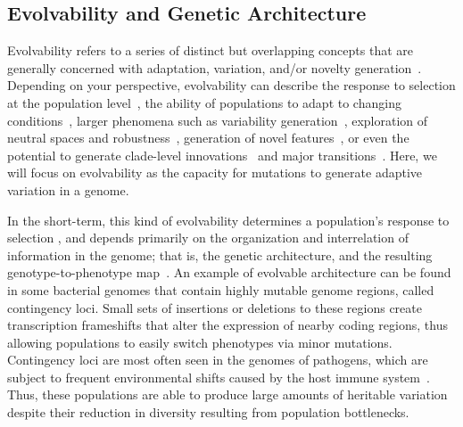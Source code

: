 \documentclass[10pt,letterpaper]{article}
\begin{document}
\subsection*{Evolvability and Genetic Architecture}
Evolvability refers to a series of distinct but overlapping concepts that are generally concerned with adaptation, variation, and/or novelty generation~\cite{pigliucci_is_2008}. Depending on your perspective, evolvability can describe the response to selection at the population level~\cite{fisher_genetical_1930,houle_comparing_1992}, the ability of populations to adapt to changing conditions~\cite{belle_code_2002}, larger phenomena such as variability generation~\cite{gunter_p._wagner_perspective:_1996}, 
exploration of neutral spaces and robustness~\cite{andreas_wagner_robustness_2005,kitano_biological_2004}, 
generation of novel features~\cite{alberch_genes_1991,brookfield_evolution:_2001}, 
or even the potential to generate clade-level innovations~\cite{kirschner_evolvability_1998} 
and major transitions~\cite{smith_major_1995}. Here, we will focus on evolvability as the capacity for mutations to generate adaptive variation in a genome. 

In the short-term, this kind of evolvability determines a population's response to selection%
, and depends primarily on the organization and interrelation of information in the genome; that is, the genetic architecture, and the resulting genotype-to-phenotype map~\cite{gunter_p._wagner_perspective:_1996}. An example of evolvable architecture can be found in some bacterial genomes that contain highly mutable genome regions, called contingency loci. Small sets of insertions or deletions to these regions create transcription frameshifts that alter the expression of nearby coding regions, thus allowing populations to easily switch phenotypes via minor mutations. Contingency loci are most often seen in the genomes of pathogens, which are subject to frequent environmental shifts caused by the host immune system~\cite{bayliss_simple_2001}. Thus, these populations are able to produce large amounts of heritable variation despite their reduction in diversity resulting from population bottlenecks.
\end{document}
